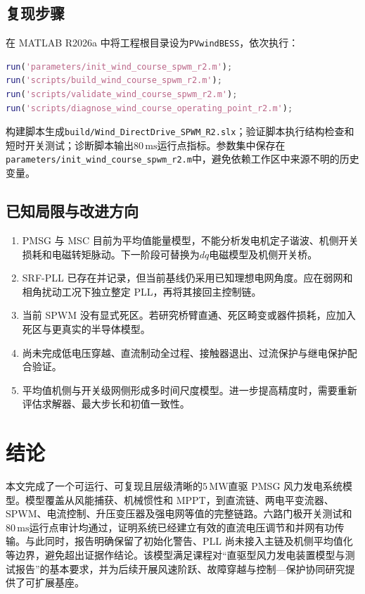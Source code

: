 \documentclass[UTF8,zihao=-4,fontset=fandol]{ctexrep}
\begin{document}
\section{复现步骤}
在 MATLAB R2026a 中将工程根目录设为\texttt{PVwindBESS}，依次执行：
\begin{lstlisting}[language=Matlab]
run('parameters/init_wind_course_spwm_r2.m');
run('scripts/build_wind_course_spwm_r2.m');
run('scripts/validate_wind_course_spwm_r2.m');
run('scripts/diagnose_wind_course_operating_point_r2.m');
\end{lstlisting}
构建脚本生成\texttt{build/Wind\_DirectDrive\_SPWM\_R2.slx}；验证脚本执行结构检查和短时开关测试；诊断脚本输出\(80\,\mathrm{ms}\)运行点指标。参数集中保存在\texttt{parameters/init\_wind\_course\_spwm\_r2.m}中，避免依赖工作区中来源不明的历史变量。

\section{已知局限与改进方向}
\begin{enumerate}
  \item PMSG 与 MSC 目前为平均值能量模型，不能分析发电机定子谐波、机侧开关损耗和电磁转矩脉动。下一阶段可替换为\(dq\)电磁模型及机侧开关桥。
  \item SRF-PLL 已存在并记录，但当前基线仍采用已知理想电网角度。应在弱网和相角扰动工况下独立整定 PLL，再将其接回主控制链。
  \item 当前 SPWM 没有显式死区。若研究桥臂直通、死区畸变或器件损耗，应加入死区与更真实的半导体模型。
  \item 尚未完成低电压穿越、直流制动全过程、接触器退出、过流保护与继电保护配合验证。
  \item 平均值机侧与开关级网侧形成多时间尺度模型。进一步提高精度时，需要重新评估求解器、最大步长和初值一致性。
\end{enumerate}

\chapter{结论}
本文完成了一个可运行、可复现且层级清晰的\(5\,\mathrm{MW}\)直驱 PMSG 风力发电系统模型。模型覆盖从风能捕获、机械惯性和 MPPT，到直流链、两电平变流器、SPWM、电流控制、升压变压器及强电网等值的完整链路。六路门极开关测试和\(80\,\mathrm{ms}\)运行点审计均通过，证明系统已经建立有效的直流电压调节和并网有功传输。与此同时，报告明确保留了初始化警告、PLL 尚未接入主链及机侧平均值化等边界，避免超出证据作结论。该模型满足课程对“直驱型风力发电装置模型与测试报告”的基本要求，并为后续开展风速阶跃、故障穿越与控制---保护协同研究提供了可扩展基座。
\end{document}
